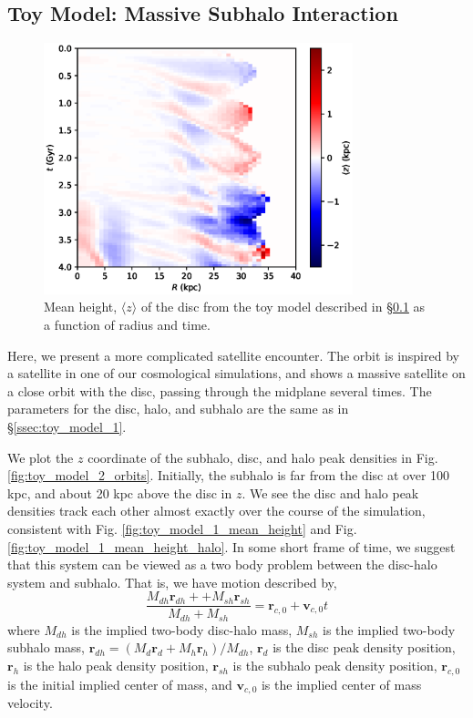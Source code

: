 \subsection{Toy Model: Massive Subhalo Interaction} \label{ssec:toy_model_2}
\begin{figure}
	\centering
	\includegraphics[width=0.8\textwidth]{../figures/b_late_light_subhalo_z_0_r_a.eps}
	\caption{Mean height, $\langle z \rangle$ of the disc from the toy model described in \S\ref{ssec:toy_model_2} as a function of radius and time.} \label{fig:toy_model_2_mean_height}
\end{figure}


Here, we present a more complicated satellite encounter. The orbit is inspired by a satellite in one of our cosmological simulations, and shows a massive satellite on a close orbit with the disc, passing through the midplane several times. The parameters for the disc, halo, and subhalo are the same as in \S\ref{ssec:toy_model_1}.


We plot the $z$ coordinate of the subhalo, disc, and halo peak densities in Fig. \ref{fig:toy_model_2_orbits}.
Initially, the subhalo is far from the disc at over 100 kpc, and about 20 kpc above the disc in $z$. We see the disc and halo peak densities track each other almost exactly over the course of the simulation, consistent with Fig. \ref{fig:toy_model_1_mean_height} and Fig. \ref{fig:toy_model_1_mean_height_halo}. In some short frame of time, we suggest that this system can be viewed as a two body problem between the disc-halo system and subhalo. That is, we have motion described by,
\begin{equation}
\frac{M_{dh}\textbf{r}_{dh} +  + M_{sh} \textbf{r}_{sh}}{M_{dh} + M_{sh}} = \textbf{r}_{c,0} + \textbf{v}_{c,0} t
\end{equation}
where $M_{dh}$ is the implied two-body disc-halo mass, $M_{sh}$ is the implied two-body subhalo mass, $\textbf{r}_{dh} = (M_d \textbf{r}_d + M_h \textbf{r}_h)/M_{dh}$, $\textbf{r}_d$ is the disc peak density position, $\textbf{r}_h$ is the halo peak density position, $\textbf{r}_{sh}$ is the subhalo peak density position, $\textbf{r}_{c,0}$ is the initial implied center of mass, and $\textbf{v}_{c,0}$ is the implied center of mass velocity.

